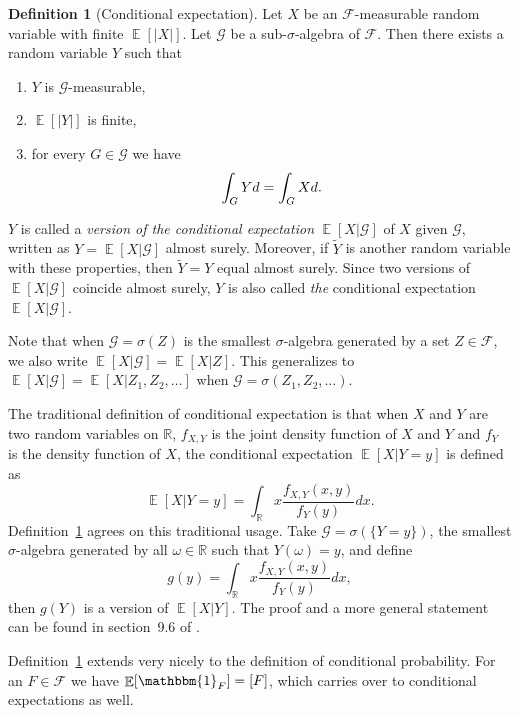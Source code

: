 \documentclass[twoside,a4paper]{report}
\theoremstyle{plain}
\theoremstyle{definition}
\newtheorem{definition}[theorem]{Definition}
\theoremstyle{remark}
\numberwithin{equation}{chapter}
\newcommand{\R}{\mathbb{R}}
\let\P\relax
\DeclareMathOperator{\P}{\mathbb{P}}
\DeclareMathOperator{\E}{\mathbb{E}}
\DeclareMathOperator{\1}{\mathbbm{1}}
\newcommand{\F}{\mathcal{F}}
\renewcommand{\G}{\mathcal{G}}
\begin{document}
\begin{definition}[Conditional expectation]\label{def:conexp}
Let $X$ be an $\F$-measurable random variable with finite $\E[|X|]$. Let $\G$ be a sub-$\sigma$-algebra of $\F$. Then there exists a random variable $Y$ such that 
\begin{enumerate}
\item $Y$ is $\G$-measurable,
\item $\E[|Y|]$ is finite,
\item for every $G\in\G$ we have 
\begin{equation}
\int_G Yd\P=\int_G Xd\P.
\end{equation}
\end{enumerate}
$Y$ is called a \emph{version of the conditional expectation} $\E[X|\G]$ of $X$ given $\G$, written as $Y=\E[X|\G]$ almost surely. Moreover, if $\tilde{Y}$ is another random variable with these properties, then $\tilde{Y}=Y$ equal almost surely. Since two versions of $\E[X|\G]$ coincide almost surely, $Y$ is also called \emph{the} conditional expectation $\E[X|\G]$.
\end{definition}

Note that when $\G=\sigma(Z)$ is the smallest $\sigma$-algebra generated by a set $Z\in\F$, we also write $\E[X|\G]=\E[X|Z]$. This generalizes to $\E[X|\G]=\E[X|Z_1,Z_2,\ldots]$ when $\G=\sigma(Z_1,Z_2,\ldots)$.

The traditional definition of conditional expectation is that when $X$ and $Y$ are two random variables on $\R$, $f_{X,Y}$ is the joint density function of $X$ and $Y$ and $f_Y$ is the density function of $X$, the conditional expectation $\E[X|Y=y]$ is defined as
\begin{equation}
\E[X|Y=y]=\int_\R x\frac{f_{X,Y}(x,y)}{f_Y(y)}dx.
\end{equation}
Definition~\ref{def:conexp} agrees on this traditional usage. Take $\G=\sigma(\{Y=y\})$, the smallest $\sigma$-algebra generated by all $\omega\in\R$ such that $Y(\omega)=y$, and define
\begin{equation}
g(y)=\int_\R x\frac{f_{X,Y}(x,y)}{f_Y(y)}dx,
\end{equation}
then $g(Y)$ is a version of $\E[X|Y]$. The proof and a more general statement can be found in section~9.6 of \cite{Williams91}.

Definition~\ref{def:conexp} extends very nicely to the definition of conditional probability. For an $F\in\F$ we have $\E[\1_F]=\P[F]$, which carries over to conditional expectations as well.
\end{document}
